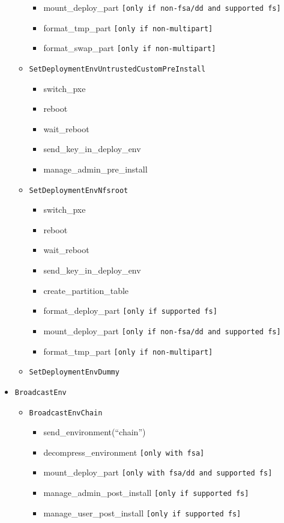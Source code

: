 \documentclass[a4wide,10pt,oneside]{book}
\begin{document}
\begin{itemize}
\begin{itemize}
\begin{itemize}
    \item mount\_deploy\_part \texttt{[only if non-fsa/dd and supported fs]}
    \item format\_tmp\_part \texttt{[only if non-multipart]}
    \item format\_swap\_part \texttt{[only if non-multipart]}
    \end{itemize}
  \item \texttt{SetDeploymentEnvUntrustedCustomPreInstall}
    \begin{itemize}
    \item switch\_pxe
    \item reboot
    \item wait\_reboot
    \item send\_key\_in\_deploy\_env
    \item manage\_admin\_pre\_install
    \end{itemize}
  \item \texttt{SetDeploymentEnvNfsroot}
    \begin{itemize}
    \item switch\_pxe
    \item reboot
    \item wait\_reboot
    \item send\_key\_in\_deploy\_env
    \item create\_partition\_table
    \item format\_deploy\_part \texttt{[only if supported fs]}
    \item mount\_deploy\_part \texttt{[only if non-fsa/dd and supported fs]}
    \item format\_tmp\_part \texttt{[only if non-multipart]}
    \end{itemize}
  \item \texttt{SetDeploymentEnvDummy}
  \end{itemize}
\item \texttt{BroadcastEnv}
  \begin{itemize}
    \item \texttt{BroadcastEnvChain}
      \begin{itemize}
      \item send\_environment(``chain'')
      \item decompress\_environment \texttt{[only with fsa]}
      \item mount\_deploy\_part \texttt{[only with fsa/dd and supported fs]}
      \item manage\_admin\_post\_install \texttt{[only if supported fs]}
      \item manage\_user\_post\_install \texttt{[only if supported fs]}

\end{itemize}
\end{itemize}
\end{itemize}
\end{document}
